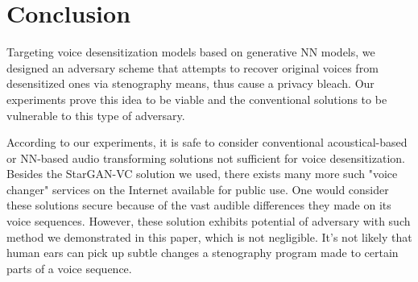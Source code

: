 \documentclass[journal]{IEEEtran} %
\begin{document}
\section{Conclusion}
\label{seg:conclusion}

Targeting voice desensitization models based on generative NN models, we designed an adversary scheme that attempts to recover original voices from desensitized ones via stenography means, thus cause a privacy bleach. Our experiments prove this idea to be viable and the conventional solutions to be vulnerable to this type of adversary.

According to our experiments, it is safe to consider conventional acoustical-based or NN-based audio transforming solutions not sufficient for voice desensitization. Besides the StarGAN-VC solution we used, there exists many more such "voice changer" services on the Internet available for public use. One would consider these solutions secure because of the vast audible differences they made on its voice sequences. However, these solution exhibits potential of adversary with such method we demonstrated in this paper, which is not negligible. It's not likely that human ears can pick up subtle changes a stenography program made to certain parts of a voice sequence.
\end{document}
